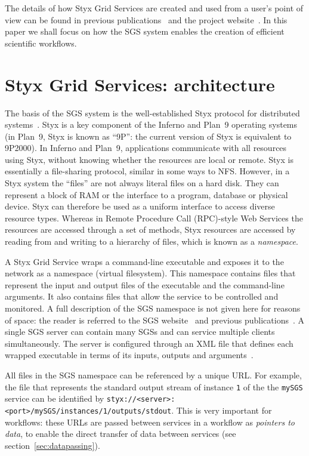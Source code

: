 \documentclass[a4paper]{article}
\begin{document}
The details of how Styx Grid Services are created and used from a user's point of view can be found in previous publications~\cite{blower_escience:2006, blower_lncs:2006, blower:2005} and the project website~\cite{sgswebsite}.  In this paper we shall focus on how the SGS system enables the creation of efficient scientific workflows. 

\section{Styx Grid Services: architecture}\label{sec:architecture}

The basis of the SGS system is the well-established Styx protocol for distributed systems~\cite{Pike:1999}.  Styx is a key component of the Inferno \cite{Inferno} and Plan~9 \cite{Plan9} operating systems (in Plan~9, Styx is known as ``9P'': the current version of Styx is equivalent to 9P2000).  In Inferno and Plan~9, applications communicate with all resources using Styx, without knowing whether the resources are local or remote.  Styx is essentially a file-sharing protocol, similar in some ways to NFS.  However, in a Styx system the ``files'' are not always literal files on a hard disk.  They can represent a block of RAM or the interface to a program, database or physical device.  Styx can therefore be used as a uniform interface to access diverse resource types.  Whereas in Remote Procedure Call (RPC)-style Web Services the resources are accessed through a set of methods, Styx resources are accessed by reading from and writing to a hierarchy of files, which is known as a \textit{namespace\/}.

A Styx Grid Service wraps a command-line executable and exposes it to the network as a namespace (virtual filesystem).  This namespace contains files that represent the input and output files of the executable and the command-line arguments.  It also contains files that allow the service to be controlled and monitored.  A full description of the SGS namespace is not given here for reasons of space: the reader is referred to the SGS website~\cite{sgswebsite} and previous publications~\cite{blower_escience:2006, blower_lncs:2006, blower:2005}.  A single SGS server can contain many SGSs and can service multiple clients simultaneously.  The server is configured through an XML file that defines each wrapped executable in terms of its inputs, outputs and arguments~\cite{blower_escience:2006}.

All files in the SGS namespace can be referenced by a unique URL.  For example, the file that represents the standard output stream of instance \texttt{1} of the the \texttt{mySGS} service can be identified by \texttt{styx://<server>:<port>/mySGS/instances/1/outputs/stdout}.  This is very important for workflows: these URLs are passed between services in a workflow as \textit{pointers to data}, to enable the direct transfer of data between services (see section~\ref{sec:datapassing}).
\end{document}
